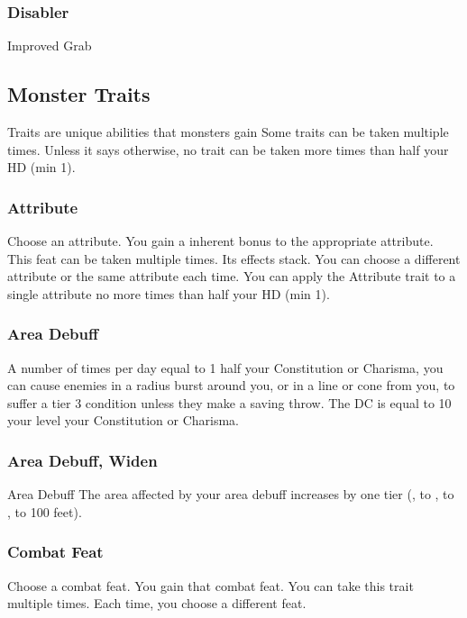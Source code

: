 \subsubsection{Disabler}
\begin{itemize*}
    \item Improved Grab
\end{itemize*}

\subsection{Monster Traits}
Traits are unique abilities that monsters gain
Some traits can be taken multiple times. Unless it says otherwise, no trait can be taken more times than half your HD (min 1).

\subsubsection{Attribute}
Choose an attribute.
\featben You gain a  inherent bonus to the appropriate attribute.
 This feat can be taken multiple times. Its effects stack. You can choose a different attribute or the same attribute each time. You can apply the Attribute trait to a single attribute no more times than half your HD (min 1).

\subsubsection{Area Debuff}
\featben A number of times per day equal to 1 \add half your Constitution or Charisma, you can cause enemies in a \areasmall radius burst around you, or in a \areamed line or cone from you, to suffer a tier 3 condition unless they make a saving throw. The DC is equal to 10 \add your level \add your Constitution or Charisma.

\subsubsection{Area Debuff, Widen}
\featpre Area Debuff
\featben The area affected by your area debuff increases by one tier (\areasmall, to \areamed, to \arealarge, to 100 feet).

\subsubsection{Combat Feat}
Choose a combat feat.
\featben You gain that combat feat.
 You can take this trait multiple times. Each time, you choose a different feat.

